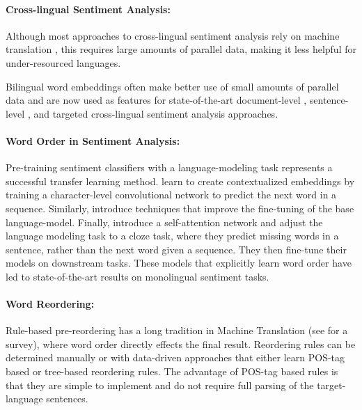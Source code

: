 \documentclass[a4paper,11pt,twocolumn,twoside]{article}
\begin{document}
\paragraph{Cross-lingual Sentiment Analysis: }

Although most approaches to cross-lingual sentiment analysis rely on machine translation \cite{Banea2008,Balahur2014d,Klinger2015}, this requires large amounts of parallel data,
making it less helpful for under-resourced languages.


Bilingual word embeddings \cite{Mikolov2013translation,Artetxe2017,Lample2017} often make 
better use of small amounts of parallel data and are now used as features for state-of-the-art document-level \cite{Chen2016}, sentence-level \cite{Barnes2018b}, and targeted \cite{Hangya2018} cross-lingual sentiment analysis approaches.


\paragraph{Word Order in Sentiment Analysis: }

Pre-training sentiment classifiers with a language-modeling task represents a successful transfer learning method.  learn
to create contextualized embeddings by training a character-level convolutional
network to predict the next word in a sequence. Similarly,  introduce techniques that improve the fine-tuning of the base language-model. Finally, 
 introduce a self-attention network and adjust the language
modeling task to a cloze task, where they predict missing words in a sentence, rather than the next word given a sequence. They then fine-tune their models on downstream tasks. These models that explicitly learn word order have led to state-of-the-art results on monolingual sentiment tasks.

\paragraph{Word Reordering: }

Rule-based pre-reordering has a long tradition in Machine Translation (see  for a survey), where word order directly effects the final result. Reordering rules can be determined manually \cite{Collins2005,Gojun2012} or with data-driven approaches that either learn POS-tag based \cite{Crego2006,Crego2006b} or tree-based \cite{Neubig2012,Nakagawa2015} reordering rules. The advantage of POS-tag based rules is that they are simple to implement and do not require full parsing of the target-language sentences.
\end{document}
